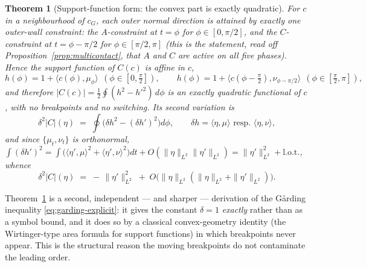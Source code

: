 \documentclass[11pt]{amsart}
\theoremstyle{plain}
\newtheorem{theorem}{Theorem}
\theoremstyle{definition}
\newcommand{\cG}{c_{G}}
\begin{document}
\begin{theorem}[Support-function form: the convex part is exactly quadratic]
\label{thm:support}
For $c$ in a neighbourhood of $\cG$, each outer normal direction is
attained by exactly one outer-wall constraint: the $A$-constraint at
$t=\phi$ for $\phi\in[0,\pi/2]$, and the $C$-constraint at
$t=\phi-\pi/2$ for $\phi\in[\pi/2,\pi]$ (this is the statement, read off
Proposition~\ref{prop:multicontact}, that $A$ and $C$ are active on
\emph{all five} phases).  Hence the support function of $C(c)$ is
\emph{affine} in $c$,
\begin{equation}\label{eq:h-affine}
   h(\phi) = 1 + \langle c(\phi),\mu_{\phi}\rangle
   \ \ (\phi\in[0,\tfrac\pi2]),
   \qquad
   h(\phi) = 1 + \langle c(\phi-\tfrac\pi2),\nu_{\phi-\pi/2}\rangle
   \ \ (\phi\in[\tfrac\pi2,\pi]),
\end{equation}
and therefore $|C(c)| = \tfrac12\oint (h^{2}-h'^{2})\,d\phi$ is an
\emph{exactly quadratic} functional of $c$, with no breakpoints and no
switching.  Its second variation is
\begin{equation}\label{eq:d2-convex}
   \delta^{2}|C|(\eta)
   \;=\; \oint\bigl(\delta h^{2}-(\delta h')^{2}\bigr)d\phi ,
   \qquad
   \delta h = \langle\eta,\mu\rangle \text{ resp.\ } \langle\eta,\nu\rangle ,
\end{equation}
and since $\{\mu_{t},\nu_{t}\}$ is orthonormal,
$\int(\delta h')^{2} = \int\bigl(\langle\eta',\mu\rangle^{2}
+\langle\eta',\nu\rangle^{2}\bigr)dt + O(\|\eta\|_{L^{2}}\|\eta'\|_{L^{2}})
= \|\eta'\|^{2}_{L^{2}} + \text{l.o.t.}$, whence
\begin{equation}\label{eq:garding-support}
   \delta^{2}|C|(\eta) \;=\; -\,\|\eta'\|^{2}_{L^{2}}
     \;+\; O\bigl(\|\eta\|_{L^{2}}(\|\eta\|_{L^{2}}+\|\eta'\|_{L^{2}})\bigr).
\end{equation}
\end{theorem}

Theorem~\ref{thm:support} is a second, independent --- and sharper ---
derivation of the G\aa rding inequality \eqref{eq:garding-explicit}: it
gives the constant $\delta=1$ \emph{exactly} rather than as a symbol
bound, and it does so by a classical convex-geometry identity (the
Wirtinger-type area formula for support functions) in which breakpoints
never appear.  This is the structural reason the moving breakpoints do
not contaminate the leading order.
\end{document}
